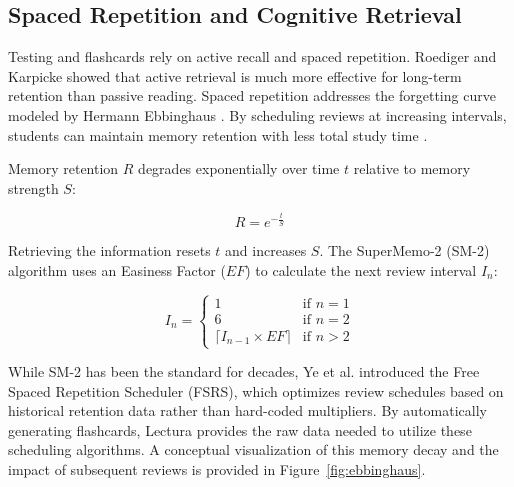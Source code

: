 \subsection{Spaced Repetition and Cognitive Retrieval}
Testing and flashcards rely on active recall and spaced repetition. Roediger and Karpicke \cite{roediger2006test} showed that active retrieval is much more effective for long-term retention than passive reading. Spaced repetition addresses the forgetting curve modeled by Hermann Ebbinghaus \cite{ebbinghaus1885memory}. By scheduling reviews at increasing intervals, students can maintain memory retention with less total study time \cite{cepeda2006distributed}.

Memory retention $R$ degrades exponentially over time $t$ relative to memory strength $S$:

\begin{equation}
    R = e^{-\frac{t}{S}}
\end{equation}

Retrieving the information resets $t$ and increases $S$. The SuperMemo-2 (SM-2) algorithm uses an Easiness Factor ($EF$) to calculate the next review interval $I_n$:

\begin{equation}
    I_n = 
    \begin{cases} 
      1 & \text{if } n = 1 \\
      6 & \text{if } n = 2 \\
      \lceil I_{n-1} \times EF \rceil & \text{if } n > 2 
   \end{cases}
\end{equation}

While SM-2 has been the standard for decades, Ye et al. \cite{ye2022stochastic} introduced the Free Spaced Repetition Scheduler (FSRS), which optimizes review schedules based on historical retention data rather than hard-coded multipliers. By automatically generating flashcards, Lectura provides the raw data needed to utilize these scheduling algorithms. A conceptual visualization of this memory decay and the impact of subsequent reviews is provided in Figure~\ref{fig:ebbinghaus}.


